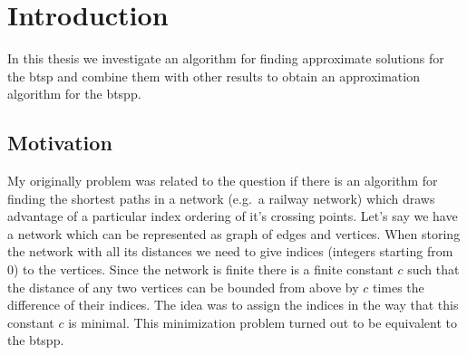 \chapter{Introduction}

In this thesis we investigate an algorithm for finding approximate solutions for the \ac{btsp} and combine them with other results to obtain an approximation algorithm for the \ac{btspp}.


\section{Motivation}
My originally problem was related to the question if there is an algorithm for finding the shortest paths in a network (e.g.\ a railway network) which draws advantage of a particular index ordering of it's crossing points.
Let's say we have a network which can be represented as graph of edges and vertices. When storing the network with all its distances we need to give indices (integers starting from 0) to the vertices. Since the network is finite there is a finite constant \(c\) such that the distance of any two vertices can be bounded from above by \(c\) times the difference of their indices. The idea was to assign the indices in the way that this constant \(c\) is minimal.
This minimization problem turned out to be equivalent to the \ac{btspp}.